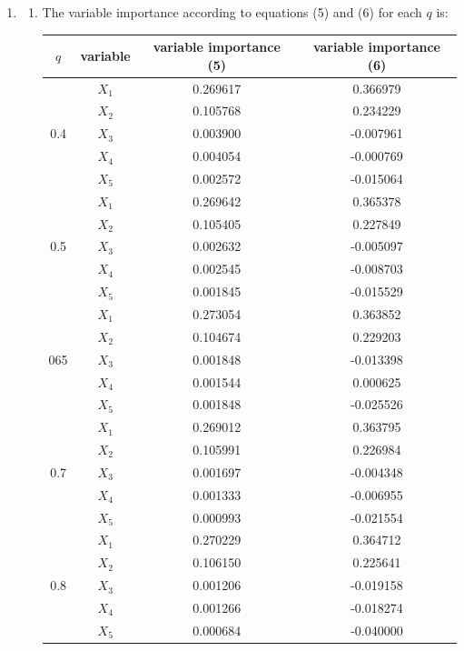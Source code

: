 \documentclass[paper=letter, fontsize=12pt]{article}
\begin{document}
\begin{enumerate}[label=(\alph*)]
	\item 
	\begin{enumerate}[label=(\roman*)]
		\item The variable importance according to equations (5) and (6) for each $q$ is:
		
		\begin{longtable}{|c|c|c|c|}
			\hline
			$q$ & variable & variable importance (5) & variable importance (6) \\ \hline
			\multirow{5}{1em}{0.4} & $X_1$ & 0.269617 & 0.366979 \\ 
			& $X_2$ & 0.105768 & 0.234229 \\
			& $X_3$ & 0.003900 & -0.007961\\
			& $X_4$ & 0.004054 & -0.000769 \\
			& $X_5$ & 0.002572 & -0.015064 \\
			\hline
			\multirow{5}{1em}{0.5} & $X_1$ & 0.269642 & 0.365378 \\ 
			& $X_2$ & 0.105405 & 0.227849 \\
			& $X_3$ & 0.002632 & -0.005097 \\
			& $X_4$ & 0.002545 & -0.008703 \\
			& $X_5$ & 0.001845 & -0.015529 \\
			\hline
			\multirow{5}{1em}{065} & $X_1$ & 0.273054 & 0.363852 \\ 
			& $X_2$ & 0.104674 & 0.229203 \\
			& $X_3$ & 0.001848 & -0.013398 \\
			& $X_4$ & 0.001544 & 0.000625 \\
			& $X_5$ & 0.001848 & -0.025526 \\
			\hline
			\multirow{5}{1em}{0.7} & $X_1$ & 0.269012 & 0.363795 \\ 
			& $X_2$ & 0.105991 & 0.226984 \\
			& $X_3$ & 0.001697 & -0.004348 \\
			& $X_4$ & 0.001333 & -0.006955 \\
			& $X_5$ & 0.000993 & -0.021554\\
			\hline
			\multirow{5}{1em}{0.8} & $X_1$ & 0.270229 & 0.364712 \\ 
			& $X_2$ & 0.106150 & 0.225641 \\
			& $X_3$ & 0.001206 & -0.019158 \\
			& $X_4$ & 0.001266 & -0.018274 \\
			& $X_5$ & 0.000684 & -0.040000 \\
			\hline
		\end{longtable}


\end{enumerate}
\end{enumerate}
\end{document}
